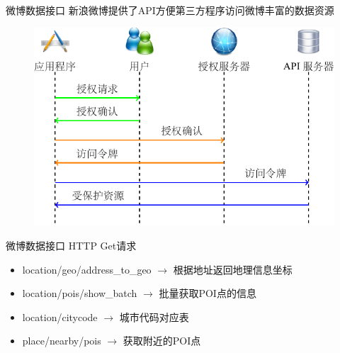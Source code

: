 \begin{frame}[c]{微博数据接口}
    新浪微博提供了API方便第三方程序访问微博丰富的数据资源

    \begin{figure}
        \includegraphics[scale=0.8]{figures/api.pdf}
    \end{figure}
\end{frame}

\begin{frame}[t]{微博数据接口}
    \alert{HTTP Get}请求

    \vspace{0.5em}
    \pause
    \begin{itemize}
    \item location/geo/address\_to\_geo $\rightarrow$  根据地址返回地理信息坐标 
    \item location/pois/show\_batch $\rightarrow$ 批量获取POI点的信息
    \item location/citycode $\rightarrow$ 城市代码对应表
    \item place/nearby/pois $\rightarrow$ 获取附近的POI点
    \end{itemize}
\end{frame}

